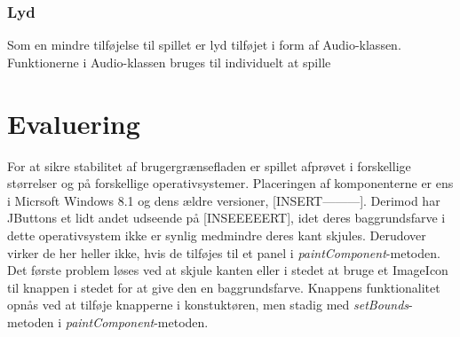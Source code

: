 \documentclass{report}
\begin{document}
\begin{figure}[h]
	\centering
	\graphicspath{ {pics/} }
	\caption{}
	\hspace{0.05\textwidth}
	\hspace{0.05\textwidth}
	\hspace{0.05\textwidth}
\end{figure}

\subsubsection{Lyd}

Som en mindre tilføjelse til spillet er lyd tilføjet i form af Audio-klassen. Funktionerne i Audio-klassen bruges til individuelt at spille 	

\section{Evaluering}
For at sikre stabilitet af brugergrænsefladen er spillet afprøvet i forskellige størrelser og på forskellige operativsystemer. Placeringen af komponenterne er ens i Micrsoft Windows 8.1 og dens ældre versioner, [INSERT---------]. Derimod har JButtons et lidt andet udseende på [INSEEEEERT], idet deres baggrundsfarve i dette operativsystem ikke er synlig medmindre deres kant skjules. Derudover virker de her heller ikke, hvis de tilføjes til et panel i \textit{paintComponent}-metoden. Det første problem løses ved at skjule kanten eller i stedet at bruge et ImageIcon til knappen i stedet for at give den en baggrundsfarve. Knappens funktionalitet opnås ved at tilføje knapperne i konstuktøren, men stadig med \textit{setBounds}-metoden i \textit{paintComponent}-metoden. 
\end{document}
